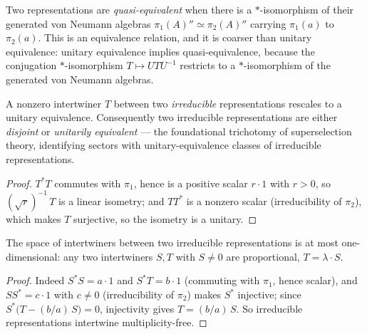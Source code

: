 \begin{definition}
    \label{def:quasi-equivalence}
    \leanok
    Two representations are \emph{quasi-equivalent} when there is a $*$-isomorphism of their generated von Neumann algebras $\pi_1(A)'' \simeq \pi_2(A)''$ carrying $\pi_1(a)$ to $\pi_2(a)$. This is an equivalence relation, and it is coarser than unitary equivalence: unitary equivalence implies quasi-equivalence, because the conjugation $*$-isomorphism $T \mapsto U T U^{-1}$ restricts to a $*$-isomorphism of the generated von Neumann algebras.
\end{definition}

\begin{theorem}
    \label{thrm:irreducible-dichotomy}
    \leanok
    A nonzero intertwiner $T$ between two \emph{irreducible} representations rescales to a unitary equivalence. Consequently two irreducible representations are either \emph{disjoint} or \emph{unitarily equivalent} --- the foundational trichotomy of superselection theory, identifying sectors with unitary-equivalence classes of irreducible representations.
\end{theorem}
\begin{proof}
    \leanok
    $T^\ast T$ commutes with $\pi_1$, hence is a positive scalar $r \cdot 1$ with $r > 0$, so $(\sqrt r)^{-1}\,T$ is a linear isometry; and $T T^\ast$ is a nonzero scalar (irreducibility of $\pi_2$), which makes $T$ surjective, so the isometry is a unitary.
\end{proof}

\begin{lemma}
    \label{lmm:schur-multiplicity}
    \leanok
    The space of intertwiners between two irreducible representations is at most one-dimensional: any two intertwiners $S, T$ with $S \neq 0$ are proportional, $T = \lambda \cdot S$.
\end{lemma}
\begin{proof}
    \leanok
    Indeed $S^\ast S = a\cdot 1$ and $S^\ast T = b \cdot 1$ (commuting with $\pi_1$, hence scalar), and $S S^\ast = c \cdot 1$ with $c \neq 0$ (irreducibility of $\pi_2$) makes $S^\ast$ injective; since $S^\ast\big(T - (b/a)\,S\big) = 0$, injectivity gives $T = (b/a)\,S$. So irreducible representations intertwine multiplicity-free.
\end{proof}

